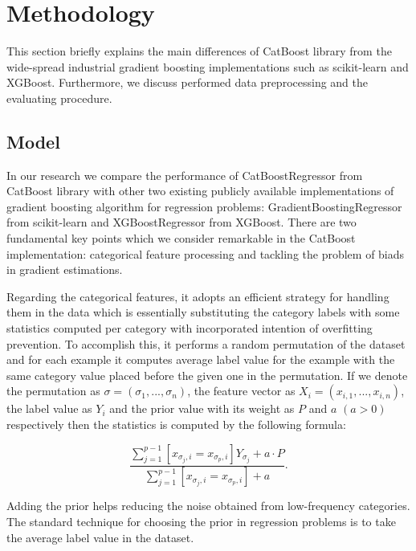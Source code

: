 \section{Methodology}
\label{sec:methodology}

This section briefly explains the main differences of CatBoost library from the wide-spread industrial gradient boosting implementations such as scikit-learn and XGBoost. Furthermore, we discuss performed data preprocessing and the evaluating procedure.

\subsection{Model}

In our research we compare the performance of CatBoostRegressor from CatBoost library with other two existing publicly available implementations of gradient boosting algorithm for regression problems: GradientBoostingRegressor from scikit-learn and XGBoostRegressor from XGBoost. There are two fundamental key points which we consider remarkable in the CatBoost implementation: categorical feature processing and tackling the problem of biads in gradient estimations. 

Regarding the categorical features, it adopts an efficient strategy for handling them in the data which is essentially substituting the category labels with some statistics computed per category with incorporated intention of overfitting prevention. To accomplish this, it performs a random permutation of the dataset and for each example it computes average label value for the example with the same category value placed before the given one in the permutation. 
If we denote the permutation as $ \sigma = (\sigma_1, ..., \sigma_n)$, the feature vector as $ X_i = (x_{i, 1}, ..., x_{i, n})$, the label value as $Y_i$ and the prior value with its weight as $P$ and $a$ $(a > 0)$ respectively then the statistics is computed by the following formula:

$$ \frac{\sum_{j=1}^{p-1} [ x_{\sigma_j, i} = x_{\sigma_p, i}] Y_{\sigma_j} + a \cdot P}{\sum_{j=1}^{p-1} [ x_{\sigma_j, i} = x_{\sigma_p, i}] + a }. $$

Adding the prior helps reducing the noise obtained from low-frequency categories. The standard technique for choosing the prior in regression problems is to take the average label value in the dataset.

